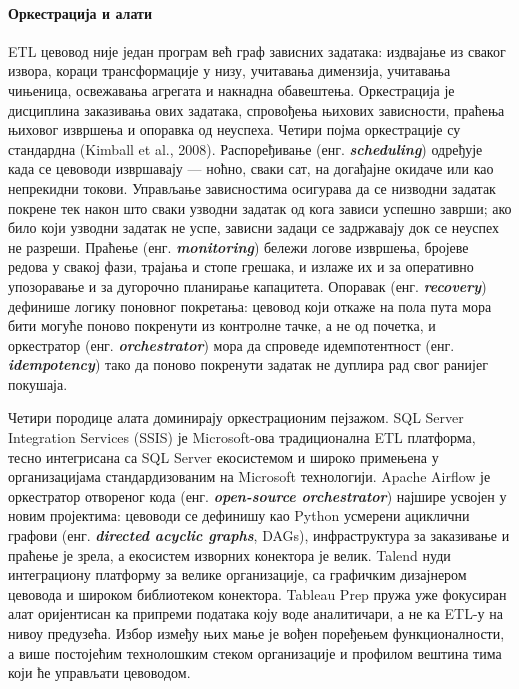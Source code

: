 \paragraph{Оркестрација и алати}
ETL цевовод није један програм већ граф зависних задатака: издвајање из сваког извора, кораци трансформације у низу, учитавања димензија, учитавања чињеница, освежавања агрегата и накнадна обавештења. Оркестрација је дисциплина заказивања ових задатака, спровођења њихових зависности, праћења њиховог извршења и опоравка од неуспеха. Четири појма оркестрације су стандардна (Kimball et al., 2008). Распоређивање (енг. \textbf{\textit{scheduling}}) одређује када се цевоводи извршавају — ноћно, сваки сат, на догађајне окидаче или као непрекидни токови. Управљање зависностима осигурава да се низводни задатак покрене тек након што сваки узводни задатак од кога зависи успешно заврши; ако било који узводни задатак не успе, зависни задаци се задржавају док се неуспех не разреши. Праћење (енг. \textbf{\textit{monitoring}}) бележи логове извршења, бројеве редова у свакој фази, трајања и стопе грешака, и излаже их и за оперативно упозоравање и за дугорочно планирање капацитета. Опоравак (енг. \textbf{\textit{recovery}}) дефинише логику поновног покретања: цевовод који откаже на пола пута мора бити могуће поново покренути из контролне тачке, а не од почетка, и оркестратор (енг. \textbf{\textit{orchestrator}}) мора да спроведе идемпотентност (енг. \textbf{\textit{idempotency}}) тако да поново покренути задатак не дуплира рад свог ранијег покушаја.

Четири породице алата доминирају оркестрационим пејзажом. SQL Server Integration Services (SSIS) је Microsoft-ова традиционална ETL платформа, тесно интегрисана са SQL Server екосистемом и широко примењена у организацијама стандардизованим на Microsoft технологији. Apache Airflow је оркестратор отвореног кода (енг. \textbf{\textit{open-source orchestrator}}) најшире усвојен у новим пројектима: цевоводи се дефинишу као Python усмерени ациклични графови (енг. \textbf{\textit{directed acyclic graphs}}, DAGs), инфраструктура за заказивање и праћење је зрела, а екосистем изворних конектора је велик. Talend нуди интеграциону платформу за велике организације, са графичким дизајнером цевовода и широком библиотеком конектора. Tableau Prep пружа уже фокусиран алат оријентисан ка припреми података коју воде аналитичари, а не ка ETL-у на нивоу предузећа. Избор између њих мање је вођен поређењем функционалности, а више постојећим технолошким стеком организације и профилом вештина тима који ће управљати цевоводом.

